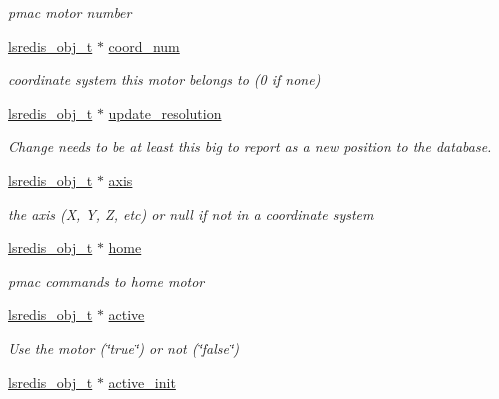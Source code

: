 \begin{DoxyCompactItemize}
\begin{DoxyCompactList}\small\item\em pmac motor number \end{DoxyCompactList}\item 
\hyperlink{pgpmac_8h_ad449de06d02791adf2498d2a1e1f909c}{lsredis\-\_\-obj\-\_\-t} $\ast$ \hyperlink{structlspmac__motor__struct_a5614e003272e8323f8809bf7b6559532}{coord\-\_\-num}
\begin{DoxyCompactList}\small\item\em coordinate system this motor belongs to (0 if none) \end{DoxyCompactList}\item 
\hyperlink{pgpmac_8h_ad449de06d02791adf2498d2a1e1f909c}{lsredis\-\_\-obj\-\_\-t} $\ast$ \hyperlink{structlspmac__motor__struct_aefa84c7592369090eec8b211caaa3a51}{update\-\_\-resolution}
\begin{DoxyCompactList}\small\item\em Change needs to be at least this big to report as a new position to the database. \end{DoxyCompactList}\item 
\hyperlink{pgpmac_8h_ad449de06d02791adf2498d2a1e1f909c}{lsredis\-\_\-obj\-\_\-t} $\ast$ \hyperlink{structlspmac__motor__struct_a7437ef16c2dce65bde4dda1ea00e9df3}{axis}
\begin{DoxyCompactList}\small\item\em the axis (X, Y, Z, etc) or null if not in a coordinate system \end{DoxyCompactList}\item 
\hyperlink{pgpmac_8h_ad449de06d02791adf2498d2a1e1f909c}{lsredis\-\_\-obj\-\_\-t} $\ast$ \hyperlink{structlspmac__motor__struct_a6dc1ceab86687f741d4c4a574501959c}{home}
\begin{DoxyCompactList}\small\item\em pmac commands to home motor \end{DoxyCompactList}\item 
\hyperlink{pgpmac_8h_ad449de06d02791adf2498d2a1e1f909c}{lsredis\-\_\-obj\-\_\-t} $\ast$ \hyperlink{structlspmac__motor__struct_aed4998885bcd5a2a30069637180f58e3}{active}
\begin{DoxyCompactList}\small\item\em Use the motor (\char`\"{}true\char`\"{}) or not (\char`\"{}false\char`\"{}) \end{DoxyCompactList}\item 
\hyperlink{pgpmac_8h_ad449de06d02791adf2498d2a1e1f909c}{lsredis\-\_\-obj\-\_\-t} $\ast$ \hyperlink{structlspmac__motor__struct_ac2a02f137e4a35db816bc728290d3558}{active\-\_\-init}

\end{DoxyCompactItemize}
